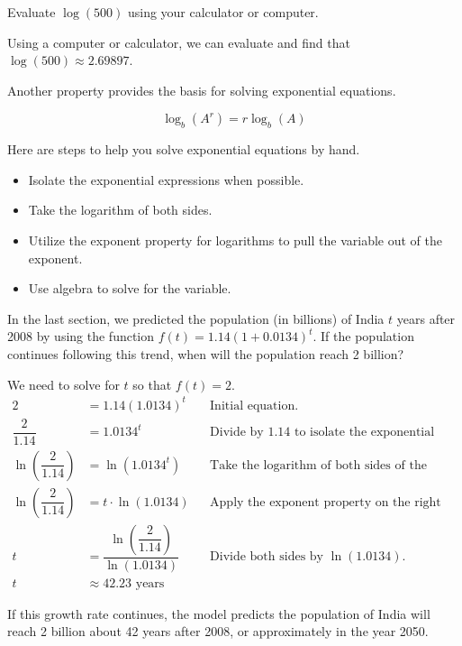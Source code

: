 \begin{example}
Evaluate $\log(500)$ using your calculator or computer.

\begin{solution}  Using a computer or calculator, we can evaluate and find that $\log(500)\approx   2.69897$.
\end{solution}\end{example}

Another property provides the basis for solving exponential equations.

\begin{theorem}
$$\log_b(A^r)=r\log_b(A)$$
\end{theorem}

\begin{remark} Here are steps to help you solve exponential equations by hand.
\begin{itemize}
  \item Isolate the exponential expressions when possible.
  \item Take the logarithm of both sides.
  \item Utilize the exponent property for logarithms to pull the variable out of the exponent.
  \item Use algebra to solve for the variable.
\end{itemize}
\end{remark}
\begin{example}
In the last section, we predicted the population (in billions) of India $t$ years after 2008 by using the function $f(t)=1.14(1+0.0134)^t$. If the population continues following this trend, when will the population reach 2 billion?

\begin{solution}  We need to solve for $t$ so that $f(t)=2$.
\begin{align*}
    2 &= 1.14(1.0134)^t&  &\mbox{Initial equation.}\\
    \dfrac{2}{1.14} &= 1.0134^t&  & \mbox{Divide by 1.14 to isolate the exponential expression.}\\
    \ln\left(\dfrac{2}{1.14}\right) &= \ln\left(1.0134^t\right)&  &\mbox{Take the logarithm of both sides of the equation.}\\
    \ln\left(\dfrac{2}{1.14}\right) &= t\cdot\ln(1.0134)& &\mbox{Apply the exponent property on the right side.}\\
    t &= \dfrac{\ln\left(\dfrac{2}{1.14}\right)}{\ln(1.0134)}& &\mbox{Divide both sides by } \ln(1.0134).\\
    t &\approx 42.23 \mbox{ years} & &
\end{align*}

If this growth rate continues, the model predicts the population of India will reach 2 billion about 42 years after 2008, or approximately in the year 2050.
\end{solution}\end{example}
